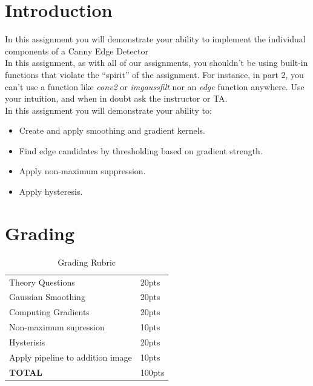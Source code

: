 \documentclass[12pt]{article}
\begin{document}
\maketitle


\section*{Introduction}
In this assignment you will demonstrate your ability to implement the individual components of a Canny Edge Detector\\

\noindent
In this assignment, as with all of our assignments, you shouldn't be using built-in functions that violate the ``spirit'' of the assignment.  For instance, in part 2, you can't use a function like \emph{conv2} or \emph{imgaussfilt} nor an \emph{edge} function anywhere.  Use your intuition, and when in doubt ask the instructor or TA.\\

\noindent
In this assignment you will demonstrate your ability to:
\begin{itemize}
\item Create and apply smoothing and gradient kernels.
\item Find edge candidates by thresholding based on gradient strength.
\item Apply non-maximum suppression.
\item Apply hysteresis.

\end{itemize}

\section*{Grading}
\begin{table}[h]
\begin{centering}
\begin{tabular}{|l|l|}
\hline
Theory Questions & 20pts \\
Gaussian Smoothing & 20pts\\
Computing Gradients & 20pts\\
Non-maximum supression & 10pts\\
Hysterisis & 20pts\\
Apply pipeline to addition image & 10pts\\
\hline
\textbf{TOTAL} & 100pts\\
\hline
\end{tabular}
\caption{Grading Rubric}
\end{centering}
\end{table}
\end{document}
